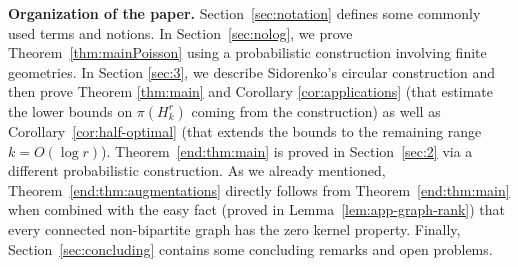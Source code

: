 \documentclass[12pt,a4paper]{article}
\numberwithin{equation}{section}
\theoremstyle{definition}
\theoremstyle{remark}
\newcommand{\hide}[1]{{\color{DarkGreen}#1}}
\renewcommand{\hide}[1]{}
\begin{document}
\medskip\noindent\textbf{Organization of the paper.} Section~\ref{sec:notation} defines some commonly used terms and notions. 
In Section~\ref{sec:nolog},  we prove Theorem~\ref{thm:mainPoisson} using a probabilistic construction involving finite geometries.
In Section \ref{sec:3}, we describe Sidorenko's circular construction and then prove Theorem \ref{thm:main} and Corollary \ref{cor:applications} (that estimate the lower bounds on $\pi(H_k^r)$ coming from the construction) as well as Corollary~\ref{cor:half-optimal} (that extends the bounds to the remaining range $k=O(\log r)$). 
Theorem~\ref{end:thm:main} is proved in Section~\ref{sec:2} via a different probabilistic construction.
As we already mentioned, Theorem~\ref{end:thm:augmentations} directly follows from Theorem~\ref{end:thm:main} when combined with the easy fact (proved in Lemma~\ref{lem:app-graph-rank}) that every connected non-bipartite graph has the zero kernel property. Finally, Section~\ref{sec:concluding} contains some concluding remarks and open problems.



\hide{
In Section \ref{sec:3}, we prove Theorem \ref{thm:main} and Corollary \ref{cor:applications}.  
Sidorenko's circular construction and the R\'enyi exponential representation reduce the required lower bound to estimating the minimum of cyclic sums of independent exponential random variables.  
After centering these variables, we divide the cyclic sums into blocks and apply a maximal inequality for ordinary partial sums.  
This gives a uniform estimate for the minimum when $m\le r/2$.  When $m>r/2$, a complement identity reduces the problem to cyclic sums of length $r-m$.  Combining the resulting lower bound with the known upper bound proves the finite estimate in Theorem \ref{thm:main}. We later use Theorem \ref{thm:main} to prove Corollary \ref{cor:applications}.
}
\end{document}
